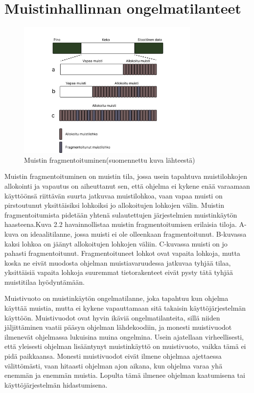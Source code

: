 \section{Muistinhallinnan ongelmatilanteet}

\begin{figure}[tbh]
{\begin{centering}
\includegraphics[width=0.8\textwidth]{kuvat/fragmentaatio.pdf}
\par\end{centering}}
\caption{Muistin fragmentoituminen\cite{ammsfmes@2016}(suomennettu kuva lähteestä)}
\end{figure}

Muistin fragmentoituminen on muistin tila, jossa usein tapahtuva muistilohkojen allokointi ja vapautus on aiheuttanut sen, että ohjelma ei kykene enää varaamaan käyttöönsä riittävän suurta jatkuvaa muistilohkoa, vaan vapaa muisti on pirstoutunut yksittäisiksi lohkoiksi jo allokoitujen lohkojen välin. Muistin fragmentoitumista pidetään yhtenä sulautettujen järjestelmien muistinkäytön haasteena.\cite{ammsfmes@2016}Kuva 2.2 havainnollistaa muistin fragmentoitumisen erilaisia tiloja. A-kuva on ideaalitilanne, jossa muisti ei ole olleenkaan fragmentoitunut. B-kuvassa kaksi lohkoa on jäänyt allokoitujen lohkojen väliin. C-kuvassa muisti on jo pahasti fragmentoitunut. Fragmentoituneet lohkot ovat vapaita lohkoja, mutta koska ne eivät muodosta ohjelman muistiavaruudessa jatkuvaa tyhjää tilaa, yksittäisiä vapaita lohkoja suuremmat tietorakenteet eivät pysty tätä tyhjää muistitilaa hyödyntämään.

Muistivuoto on muistinkäytön ongelmatilanne, joka tapahtuu kun ohjelma käyttää muistia, mutta ei kykene vapauttamaan sitä takaisin käyttöjärjestelmän käyttöön. Muistivuodot ovat hyvin ikäviä ongelmatilanteita, sillä niiden jäljittäminen vaatii pääsyn ohjelman lähdekoodiin, ja monesti muistivuodot ilmenevät ohjelmassa lukuisina muina ongelmina. Usein ajatellaan virheellisesti, että yleisesti ohjelman lisääntynyt muistinkäyttö on muistivuoto, vaikka tämä ei pidä paikkaansa. Monesti muistivuodot eivät ilmene ohjelmaa ajettaessa välittömästi, vaan hitaasti ohjelman ajon aikana, kun ohjelma varaa yhä enemmän ja enemmän muistia. Lopulta tämä ilmenee ohjelman kaatumisena tai käyttöjärjestelmän hidastumisena.\cite{mmic2010}

